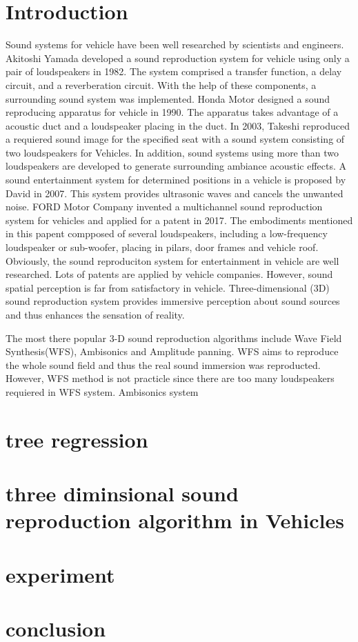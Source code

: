 \documentclass[runningheads,a4paper]{llncs}
\begin{document}
\section{Introduction}\label{sec:Intro}
Sound systems for vehicle have been well researched by scientists and engineers.   Akitoshi Yamada developed a sound reproduction system for vehicle using only a pair of loudspeakers in 1982\cite{Akito82}. The system comprised a transfer function, a delay circuit, and a reverberation circuit. With the help of these components, a surrounding sound system was implemented. 
Honda Motor designed a sound reproducing apparatus for vehicle in 1990\cite{terai1990sound}. The apparatus takes advantage of a acoustic duct and a loudspeaker placing in the duct. 
In 2003, Takeshi reproduced a requiered sound image for the specified seat with a sound system consisting of two loudspeakers for Vehicles\cite{Takeshi03}. 
In addition, sound systems using more than two loudspeakers are developed to generate surrounding ambiance acoustic effects\cite{clark1998vehicle}\cite{orellana2015loudspeaker}. A sound entertainment system for determined positions in a vehicle is proposed by David in 2007. This system provides ultrasonic waves and cancels the unwanted noise\cite{David07}. 
FORD Motor Company invented a multichannel sound reproduction system for vehicles and applied for a patent in 2017\cite{orellana2015loudspeaker}. The embodiments mentioned in this papent compposed of several loudspeakers, including a low-frequency loudspeaker or sub-woofer, placing in pilars, door frames and vehicle roof. Obviously, the sound reproduciton system for entertainment in vehicle are well researched. Lots of patents are applied by vehicle companies\cite{Simon2005}\cite{Miriam2014}\cite{David07}\cite{Gibson15}. However, sound spatial perception is far from satisfactory in vehicle.  Three-dimensional (3D) sound reproduction system provides immersive perception about sound sources and thus enhances the sensation of reality\cite{AasthaTASLP11}\cite{Danilo15TMM}\cite{zms2015}. 


The most there popular 3-D sound reproduction algorithms include Wave Field Synthesis(WFS), Ambisonics and Amplitude panning. WFS aims to reproduce the whole sound field and thus the real sound immersion was reproducted. However, WFS method is not practicle since there are too many loudspeakers requiered in WFS system. Ambisonics system  


\section{tree regression}\label{sec:regression}

\section{three diminsional sound reproduction algorithm in Vehicles}\label{sec:algorithm}

\section{experiment}\label{sec:experiment}

\section{conclusion}\label{sec:conclusion}

\label{bib:bibliography}



\end{document}
